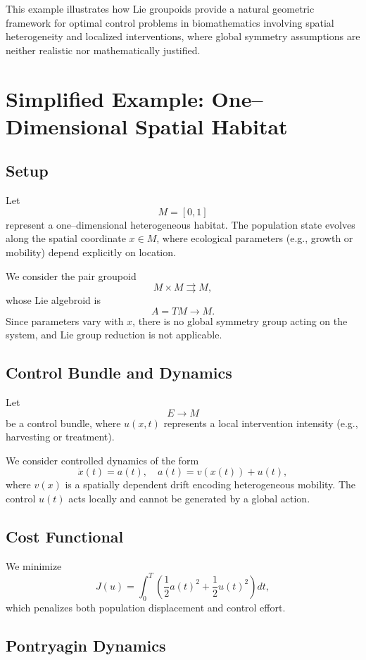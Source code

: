 \documentclass{article}
\begin{document}
This example illustrates how Lie groupoids provide a natural geometric framework for optimal control problems in biomathematics involving spatial heterogeneity and localized interventions, where global symmetry assumptions are neither realistic nor mathematically justified.





\section*{Simplified Example: One–Dimensional Spatial Habitat}

\subsection*{Setup}

Let 
\[
M = [0,1]
\] 
represent a one–dimensional heterogeneous habitat. The population state evolves along the spatial coordinate $x \in M$, where ecological parameters (e.g., growth or mobility) depend explicitly on location.

We consider the pair groupoid 
\[
M \times M \rightrightarrows M,
\] 
whose Lie algebroid is 
\[
A = TM \to M.
\] 
Since parameters vary with $x$, there is no global symmetry group acting on the system, and Lie group reduction is not applicable.

\subsection*{Control Bundle and Dynamics}

Let 
\[
E \to M
\] 
be a control bundle, where $u(x,t)$ represents a local intervention intensity (e.g., harvesting or treatment).

We consider controlled dynamics of the form
\[
\dot{x}(t) = a(t), \quad a(t) = v(x(t)) + u(t),
\]
where $v(x)$ is a spatially dependent drift encoding heterogeneous mobility. The control $u(t)$ acts locally and cannot be generated by a global action.

\subsection*{Cost Functional}

We minimize
\[
J(u) = \int_0^T \left( \frac{1}{2} a(t)^2 + \frac{1}{2} u(t)^2 \right) dt,
\]
which penalizes both population displacement and control effort.

\subsection*{Pontryagin Dynamics}
\end{document}
